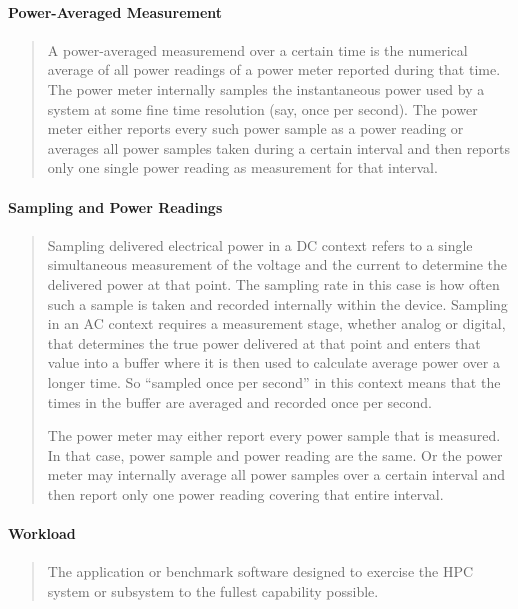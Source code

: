 \paragraph*{Power-Averaged Measurement}
\begin{quote}
A power-averaged measuremend over a certain time is the numerical average of all power readings of a power meter reported during that time.
The power meter internally samples the instantaneous power used by a system at some fine time resolution (say, once per second).
The power meter either reports every such power sample as a power reading or averages all power samples taken during a certain interval and then reports only one single power reading as measurement for that interval.
\end{quote}

\paragraph*{Sampling and Power Readings}
\begin{quote}
Sampling delivered electrical power in a DC context refers to a single simultaneous measurement of the voltage and the current to determine the delivered power at that point.
The sampling rate in this case is how often such a sample is taken and recorded internally within the device.
Sampling in an AC context requires a measurement stage, whether analog or digital, that determines the true power delivered at that point and enters that value into a buffer where it is then used to calculate average power over a longer time.
So ``sampled once per second'' in this context means that the times in the buffer are averaged and recorded once per second.

The power meter may either report every power sample that is measured.
In that case, power sample and power reading are the same.
Or the power meter may internally average all power samples over a certain interval and then report only one power reading covering that entire interval.
\end{quote}

\paragraph*{Workload}
\begin{quote}
The application or benchmark software designed to exercise the HPC system or subsystem to
the fullest capability possible.
\end{quote}

